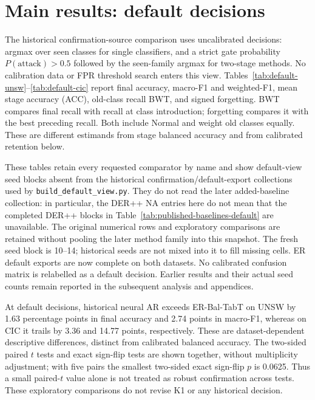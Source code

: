 \documentclass[10pt,twocolumn]{article}
\begin{document}
\section{Main results: default decisions}
\label{sec:default-results}
The historical confirmation-source comparison uses uncalibrated decisions: argmax over seen classes for single classifiers, and a strict gate probability $P(\mathrm{attack})>0.5$ followed by the seen-family argmax for two-stage methods. No calibration data or FPR threshold search enters this view. Tables~\ref{tab:default-unsw}--\ref{tab:default-cic} report final accuracy, macro-F1 and weighted-F1, mean stage accuracy (ACC), old-class recall BWT, and signed forgetting. BWT compares final recall with recall at class introduction; forgetting compares it with the best preceding recall. Both include Normal and weight old classes equally. These are different estimands from stage balanced accuracy and from calibrated retention below.


These tables retain every requested comparator by name and show default-view seed blocks absent from the historical confirmation/default-export collections used by \texttt{build\_default\_view.py}. They do not read the later added-baseline collection: in particular, the DER++ NA entries here do not mean that the completed DER++ blocks in Table~\ref{tab:published-baselines-default} are unavailable. The original numerical rows and exploratory comparisons are retained without pooling the later method family into this snapshot. The fresh seed block is 10--14; historical seeds are not mixed into it to fill missing cells. ER default exports are now complete on both datasets. No calibrated confusion matrix is relabelled as a default decision. Earlier results and their actual seed counts remain reported in the subsequent analysis and appendices.

At default decisions, historical neural AR exceeds ER-Bal-TabT on UNSW by 1.63 percentage points in final accuracy and 2.74 points in macro-F1, whereas on CIC it trails by 3.36 and 14.77 points, respectively. These are dataset-dependent descriptive differences, distinct from calibrated balanced accuracy. The two-sided paired $t$ tests and exact sign-flip tests are shown together, without multiplicity adjustment; with five pairs the smallest two-sided exact sign-flip $p$ is 0.0625. Thus a small paired-$t$ value alone is not treated as robust confirmation across tests. These exploratory comparisons do not revise K1 or any historical decision.
\end{document}
